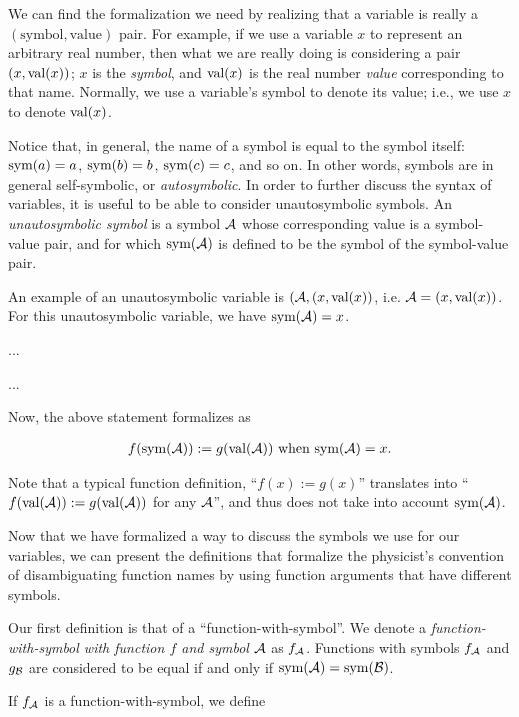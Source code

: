 \begin{itemize}
    We can find the formalization we need by realizing that a variable is really a $(\text{symbol}, \text{value})$ pair. For example, if we use a variable $x$ to represent an arbitrary real number, then what we are really doing is considering a pair $(x, \text{val}(x))$; $x$ is the \textit{symbol}, and $\text{val}(x)$ is the real number \textit{value} corresponding to that name. Normally, we use a variable's symbol to denote its value; i.e., we use $x$ to denote $\text{val}(x)$.
    
    Notice that, in general, the name of a symbol is equal to the symbol itself: $\text{sym}(a) = a$, $\text{sym}(b) = b$, $\text{sym}(c) = c$, and so on. In other words, symbols are in general self-symbolic, or \textit{autosymbolic}. In order to further discuss the syntax of variables, it is useful to be able to consider unautosymbolic symbols. An \textit{unautosymbolic symbol} is a symbol $\mathcal{A}$ whose corresponding value is a symbol-value pair, and for which $\text{sym}(\mathcal{A})$ is defined to be the symbol of the symbol-value pair.
    
    An example of an unautosymbolic variable is $(\mathcal{A}, (x, \text{val}(x))$, i.e. $\mathcal{A} = (x, \text{val}(x))$. For this unautosymbolic variable, we have $\text{sym}(\mathcal{A}) = x$.

    ...
    
    ...
    
    Now, the above statement formalizes as
    
    \begin{align*}
        f(\text{sym}(\mathcal{A})) := g(\text{val}(\mathcal{A})) \text{ when $\text{sym}(\mathcal{A}) = x$}.
    \end{align*}
    
    Note that a typical function definition, ``$f(x) := g(x)$'' translates into ``$f(\text{val}(\mathcal{A})) := g(\text{val}(\mathcal{A}))$ for any $\mathcal{A}$'', and thus does not take into account $\text{sym}(\mathcal{A})$.

    Now that we have formalized a way to discuss the symbols we use for our variables, we can present the definitions that formalize the physicist's convention of disambiguating function names by using function arguments that have different symbols.
    
    Our first definition is that of a ``function-with-symbol''. We denote a \textit{function-with-symbol with function $f$ and symbol $\mathcal{A}$} as $f_{\mathcal{A}}$. Functions with symbols $f_{\mathcal{A}}$ and $g_{\mathcal{B}}$ are considered to be equal if and only if $\text{sym}(\mathcal{A}) = \text{sym}(\mathcal{B})$.
    
    If $f_{\mathcal{A}}$ is a function-with-symbol, we define
    

\end{itemize}
